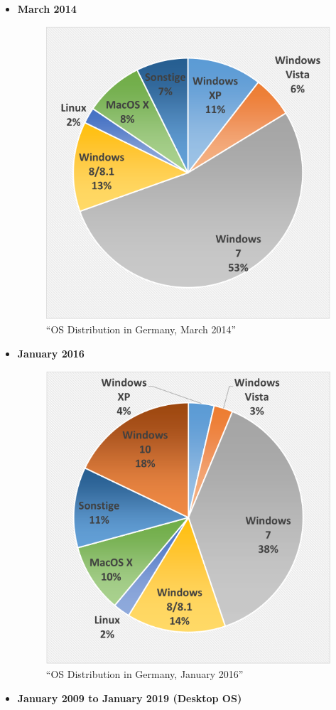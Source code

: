 \documentclass[
]{article}
\begin{document}
\begin{itemize}
\item
  \textbf{March 2014}

  \begin{figure}
  \centering
  \includegraphics{images/os_dist_g_2014.png}
  \caption{``OS Distribution in Germany, March 2014''}
  \end{figure}
\item
  \textbf{January 2016}

  \begin{figure}
  \centering
  \includegraphics{images/os_dist_g_2016.png}
  \caption{``OS Distribution in Germany, January 2016''}
  \end{figure}
\item
  \textbf{January 2009 to January 2019 (Desktop OS)}


\end{itemize}
\end{document}
